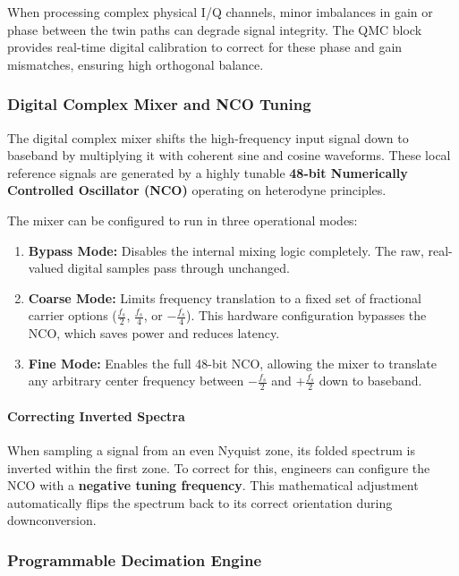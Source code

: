 \documentclass[
]{article}
\providecommand{\tightlist}{%
  \setlength{\itemsep}{0pt}\setlength{\parskip}{0pt}}
\begin{document}
When processing complex physical I/Q channels, minor imbalances in gain
or phase between the twin paths can degrade signal integrity. The QMC
block provides real-time digital calibration to correct for these phase
and gain mismatches, ensuring high orthogonal balance.

\subsubsection{Digital Complex Mixer and NCO
Tuning}\label{digital-complex-mixer-and-nco-tuning}

The digital complex mixer shifts the high-frequency input signal down to
baseband by multiplying it with coherent sine and cosine waveforms.
These local reference signals are generated by a highly tunable
\textbf{48-bit Numerically Controlled Oscillator (NCO)} operating on
heterodyne principles.

The mixer can be configured to run in three operational modes:

\begin{enumerate}
\def\labelenumi{\arabic{enumi}.}
\tightlist
\item
  \textbf{Bypass Mode:} Disables the internal mixing logic completely.
  The raw, real-valued digital samples pass through unchanged.
\item
  \textbf{Coarse Mode:} Limits frequency translation to a fixed set of
  fractional carrier options (\(\frac{f_s}{2}\), \(\frac{f_s}{4}\), or
  \(-\frac{f_s}{4}\)). This hardware configuration bypasses the NCO,
  which saves power and reduces latency.
\item
  \textbf{Fine Mode:} Enables the full 48-bit NCO, allowing the mixer to
  translate any arbitrary center frequency between \(-\frac{f_s}{2}\)
  and \(+\frac{f_s}{2}\) down to baseband.
\end{enumerate}

\paragraph{Correcting Inverted
Spectra}\label{correcting-inverted-spectra}

When sampling a signal from an even Nyquist zone, its folded spectrum is
inverted within the first zone. To correct for this, engineers can
configure the NCO with a \textbf{negative tuning frequency}. This
mathematical adjustment automatically flips the spectrum back to its
correct orientation during downconversion.

\subsubsection{Programmable Decimation
Engine}\label{programmable-decimation-engine}
\end{document}
